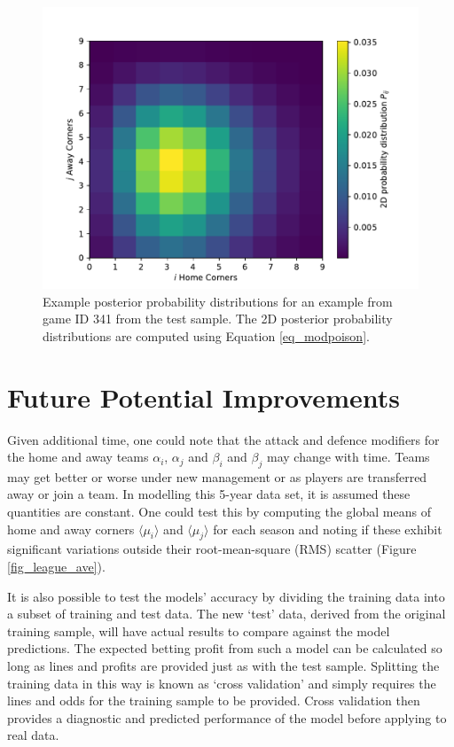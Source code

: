 \documentclass[10pt]{article}
\begin{document}
\begin{figure}
\begin{center}
\includegraphics[scale=1.0,angle=0,trim=0cm 0cm 0cm 0cm]{fig_eg_posterior.pdf}
\caption{Example posterior probability distributions for an example from game ID 341 from the test sample. The 2D posterior probability distributions are computed using Equation \ref{eq_modpoison}. }
\label{fig_posterior_eg}
\end{center}
\end{figure} 


\section{Future Potential Improvements}
Given additional time, one could note that the attack and defence modifiers for the home and away teams $\alpha_i$, $\alpha_j$ and $\beta_i$ and $\beta_j$ may change with time. Teams may get better or worse under new management or as players are transferred away or join a team. In modelling this 5-year data set, it is assumed these quantities are constant. One could test this by computing the global means of home and away corners $\langle \mu_i \rangle$ and $\langle \mu_j \rangle$ for each season and noting if these exhibit significant variations outside their root-mean-square (RMS) scatter (Figure \ref{fig_league_ave}).

It is also possible to test the models' accuracy by dividing the training data into a subset of training and test data. The new `test' data, derived from the original training sample, will have actual results to compare against the model predictions. The expected betting profit from such a model can be calculated so long as lines and profits are provided just as with the test sample. Splitting the training data in this way is known as `cross validation' and simply requires the lines and odds for the training sample to be provided. Cross validation then provides a diagnostic and predicted performance of the model before applying to real data.
\end{document}

